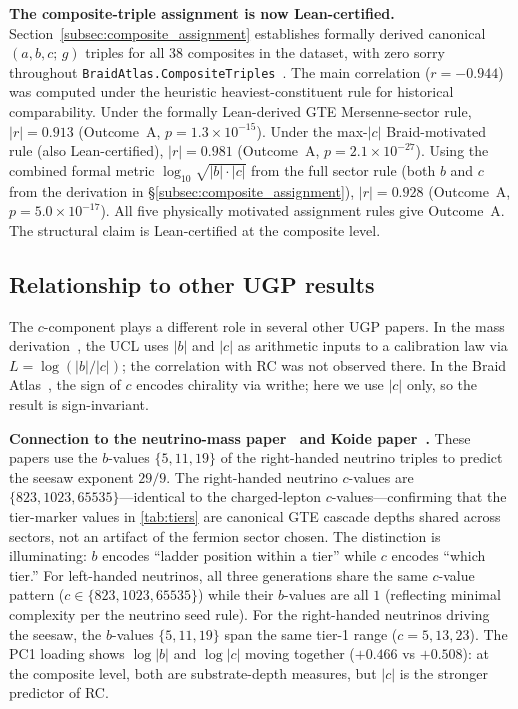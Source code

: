 \documentclass[12pt,a4paper]{article}
\begin{document}
\textbf{The composite-triple assignment is now Lean-certified.}
Section~\ref{subsec:composite_assignment} establishes formally derived
canonical $(a,b,c;\,g)$ triples for all 38 composites in the dataset,
with zero sorry throughout \texttt{BraidAtlas.CompositeTriples}~\cite{ugp-lean}.
The main correlation ($r = -0.944$) was computed under the heuristic
heaviest-constituent rule for historical comparability.
Under the formally Lean-derived GTE Mersenne-sector rule, $|r| = 0.913$
(Outcome~A, $p = 1.3\times10^{-15}$).
Under the max-$|c|$ Braid-motivated rule (also Lean-certified),
$|r| = 0.981$ (Outcome~A, $p = 2.1\times10^{-27}$).
Using the combined formal metric $\log_{10}\!\sqrt{|b|\cdot|c|}$ from the
full sector rule (both $b$ and $c$ from the derivation in §\ref{subsec:composite_assignment}),
$|r| = 0.928$ (Outcome~A, $p = 5.0\times10^{-17}$).
All five physically motivated assignment rules give Outcome~A.
The structural claim is Lean-certified at the composite level.

\subsection{Relationship to other UGP results}

The $c$-component plays a different role in several other UGP papers.
In the mass derivation~\cite{Spivack2026_SM_UGP}, the UCL uses $|b|$ and $|c|$
as arithmetic inputs to a calibration law via $L = \log(|b|/|c|)$;
the correlation with RC was not observed there.
In the Braid Atlas~\cite{SpivackBraidAtlas}, the sign of $c$ encodes
chirality via writhe; here we use $|c|$ only, so the result is sign-invariant.

\textbf{Connection to the neutrino-mass paper~\cite{SpivackNeutrino} and Koide paper~\cite{Spivack2026_Koide}.}
These papers use the $b$-values $\{5,11,19\}$ of the right-handed neutrino
triples to predict the seesaw exponent $29/9$.
The right-handed neutrino $c$-values are $\{823, 1023, 65535\}$---identical to
the charged-lepton $c$-values---confirming that the tier-marker values in
\cref{tab:tiers} are canonical GTE cascade depths shared across sectors,
not an artifact of the fermion sector chosen.
The distinction is illuminating: $b$ encodes ``ladder position within a tier''
while $c$ encodes ``which tier.''
For left-handed neutrinos, all three generations share the same $c$-value
pattern ($c \in \{823, 1023, 65535\}$) while their $b$-values are all $1$
(reflecting minimal complexity per the neutrino seed rule).
For the right-handed neutrinos driving the seesaw,
the $b$-values $\{5, 11, 19\}$ span the same tier-1 range ($c=5, 13, 23$).
The PC1 loading shows $\log|b|$ and $\log|c|$ moving together ($+0.466$ vs $+0.508$):
at the composite level, both are substrate-depth measures, but $|c|$ is the
stronger predictor of RC.
\end{document}

